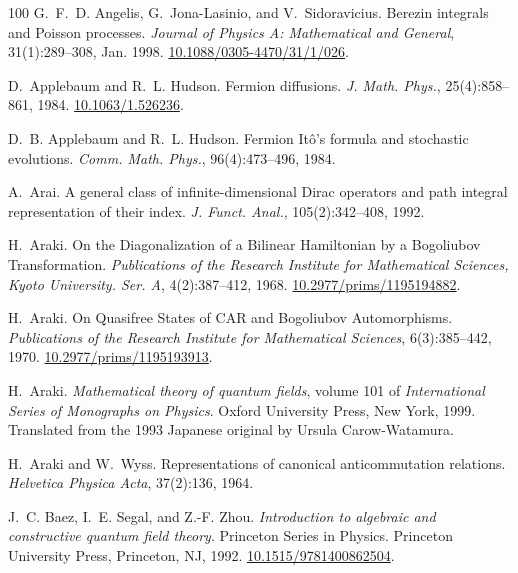 \documentclass[11pt]{article}
\newcommand{\tmtextit}[1]{{\itshape{#1}}}
\begin{document}
\begin{thebibliography}{100}
  G.~F.~D. Angelis, G.~Jona-Lasinio, and
  V.~Sidoravicius. {\newblock}Berezin integrals and Poisson processes.
  {\newblock}\tmtextit{Journal of Physics A: Mathematical and General},
  31(1):289--308, Jan. 1998. {\newblock}
  \href{https://doi.org/10.1088/0305-4470/31/1/026}{10.1088/0305-4470/31/1/026}.
  
  D.~Applebaum and R.~L. Hudson. {\newblock}Fermion
  diffusions. {\newblock}\tmtextit{J. Math. Phys.}, 25(4):858--861, 1984.
  {\newblock}\href{https://doi.org/10.1063/1.526236}{10.1063/1.526236}.
  
  D.~B. Applebaum and R.~L. Hudson. {\newblock}Fermion
  It{\^o}'s formula and stochastic evolutions. {\newblock}\tmtextit{Comm.
  Math. Phys.}, 96(4):473--496, 1984.
  
  A.~Arai. {\newblock}A general class of
  infinite-dimensional Dirac operators and path integral representation of
  their index. {\newblock}\tmtextit{J. Funct. Anal.}, 105(2):342--408, 1992.
  
  H.~Araki. {\newblock}On the
  Diagonalization of a Bilinear Hamiltonian by a Bogoliubov Transformation.
  {\newblock}\tmtextit{Publications of the Research Institute for Mathematical
  Sciences, Kyoto University. Ser. A}, 4(2):387--412, 1968. {\newblock}
  \href{https://doi.org/10.2977/prims/1195194882}{10.2977/prims/1195194882}.
  
  H.~Araki. {\newblock}On Quasifree States
  of CAR and Bogoliubov Automorphisms. {\newblock}\tmtextit{Publications of
  the Research Institute for Mathematical Sciences}, 6(3):385--442, 1970.
  {\newblock}
  \href{https://doi.org/10.2977/prims/1195193913}{10.2977/prims/1195193913}.
  
  H.~Araki. {\newblock}\tmtextit{Mathematical theory of
  quantum fields}, volume 101 of \tmtextit{International Series of Monographs
  on Physics}. {\newblock}Oxford University Press, New York, 1999.
  {\newblock}Translated from the 1993 Japanese original by Ursula
  Carow-Watamura.
  
  H.~Araki and W.~Wyss.
  {\newblock}Representations of canonical anticommutation relations.
  {\newblock}\tmtextit{Helvetica Physica Acta}, 37(2):136, 1964.
  
  J.~C. Baez, I.~E. Segal, and Z.-F. Zhou.
  {\newblock}\tmtextit{Introduction to algebraic and constructive quantum
  field theory}. {\newblock}Princeton Series in Physics. Princeton University
  Press, Princeton, NJ, 1992.
  {\newblock}\href{https://doi.org/10.1515/9781400862504}{10.1515/9781400862504}.
  

\end{thebibliography}
\end{document}
